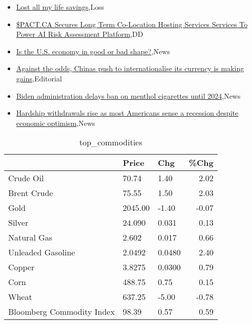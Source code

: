 \documentclass{article}%
\begin{document}
%
\begin{itemize}%
\item%
\href{https://reddit.com/r/wallstreetbets/comments/18dh5sb/lost\_all\_my\_life\_savings/}{Lost all my life savings},Loss%
\item%
\href{https://reddit.com/r/Baystreetbets/comments/18d1c82/pactca\_secures\_long\_term\_colocation\_hosting/}{\$PACT.CA Secures Long Term Co-Location Hosting Services Services To Power AI Risk Assessment Platform},DD%
\item%
\href{https://reddit.com/r/Economics/comments/18dd44y/is\_the\_us\_economy\_in\_good\_or\_bad\_shape/}{Is the U.S. economy in good or bad shape?},News%
\item%
\href{https://reddit.com/r/Economics/comments/18daf3l/against\_the\_odds\_chinas\_push\_to\_internationalise/}{Against the odds, Chinas push to internationalise its currency is making gains},Editorial%
\item%
\href{https://reddit.com/r/Economics/comments/18d83qq/biden\_administration\_delays\_ban\_on\_menthol/}{Biden administration delays ban on menthol cigarettes until 2024},News%
\item%
\href{https://reddit.com/r/Economics/comments/18d5ybz/hardship\_withdrawals\_rise\_as\_most\_americans\_sense/}{Hardship withdrawals rise as most Americans sense a recession despite economic optimism},News%
\end{itemize}%


\begin{table}[htbp]%
\caption{top\_commodities}%
\centering%
\begin{adjustbox}{width=1\textwidth}%
\begin{tabular}{lllr}
\toprule
                          &   Price &    Chg &  \%Chg \\
\midrule
               Crude Oil  &   70.74 &   1.40 &  2.02 \\
             Brent Crude  &   75.55 &   1.50 &  2.03 \\
                    Gold  & 2045.00 &  -1.40 & -0.07 \\
                  Silver  &  24.090 &  0.031 &  0.13 \\
             Natural Gas  &   2.602 &  0.017 &  0.66 \\
       Unleaded Gasoline  &  2.0492 & 0.0480 &  2.40 \\
                  Copper  &  3.8275 & 0.0300 &  0.79 \\
                    Corn  &  488.75 &   0.75 &  0.15 \\
                   Wheat  &  637.25 &  -5.00 & -0.78 \\
Bloomberg Commodity Index &   98.39 &   0.57 &  0.59 \\
\bottomrule
\end{tabular}
%
\end{adjustbox}%
\end{table}
\end{document}

